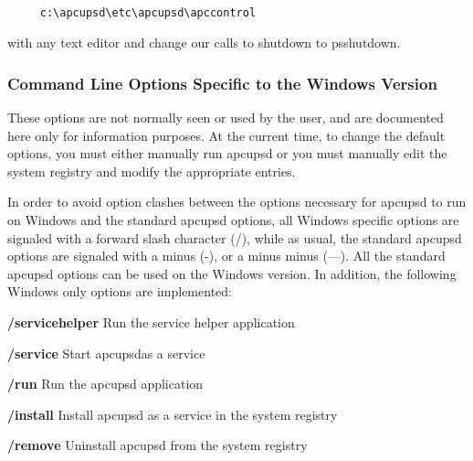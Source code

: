 {{{{{{{{{{\footnotesize
\begin{verbatim}
     
     c:\apcupsd\etc\apcupsd\apccontrol
\end{verbatim}
\normalsize

with any text editor and change our calls to shutdown to psshutdown. 

\label{Command-Line-Options-Specific-to-the-Windows-Version}

\subsubsection*{Command Line Options Specific to the Windows Version}

\label{index-Windows_002c-Options-186}
These options are not normally seen or used by the user, and are documented
here only for information purposes. At the current time, to change the default
options, you must either manually run apcupsd or you must manually edit the
system registry and modify the appropriate entries.  

In order to avoid option clashes between the options necessary for apcupsd to
run on Windows and the standard apcupsd options, all Windows specific options
are signaled with a forward slash character (/), while as usual, the standard
apcupsd options are signaled with a minus (-), or a minus minus ({---}). All
the standard apcupsd options can be used on the Windows version. In addition,
the following Windows only options are implemented:  

\begin{description}

\item {\bf /servicehelper}
Run the service helper application  

\item {\bf /service}
Start apcupsdas a service  

\item {\bf /run}
Run the apcupsd application  

\item {\bf /install}
Install apcupsd as a service in the system registry  

\item {\bf /remove}
Uninstall apcupsd from the system registry  


\end{description}}}}}}}}}}}
